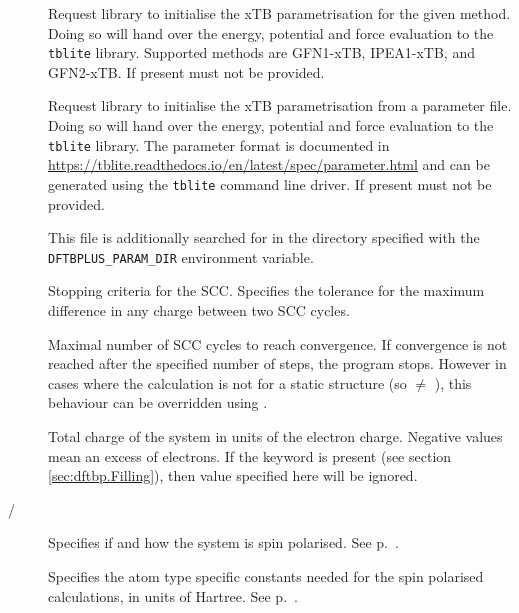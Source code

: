 \begin{description}
\item[]
  Request library to initialise the xTB parametrisation for the given method.
  Doing so will hand over the energy, potential and force evaluation to the
  \texttt{tblite} library.
  Supported methods are GFN1-xTB\cite{grimme2017}, IPEA1-xTB\cite{asgeirsson2017},
  and GFN2-xTB\cite{bannwarth2019}.
  If present  must not be provided.

\item[]
  Request library to initialise the xTB parametrisation from a parameter file.
  Doing so will hand over the energy, potential and force evaluation to the
  \texttt{tblite} library.
  The parameter format is documented in
  \url{https://tblite.readthedocs.io/en/latest/spec/parameter.html} and can
  be generated using the \texttt{tblite} command line driver.
  If present  must not be provided.

  This file is additionally searched for in the directory specified with the
  \texttt{DFTBPLUS\_PARAM\_DIR} environment variable.

\item[] Stopping criteria for the SCC.  Specifies the
  tolerance for the maximum difference in any charge between two SCC
  cycles.

\item[] Maximal number of SCC cycles to reach
  convergence. If convergence is not reached after the specified
  number of steps, the program stops. However in cases where the
  calculation is not for a static structure (so  $\neq$
  \cb), this behaviour can be overridden using
  .

\item[] Total charge of the system in units of the electron
  charge. Negative values mean an excess of electrons. If the keyword
   is present (see section \ref{sec:dftbp.Filling}), then value
  specified here will be ignored.

\item[ / ] Specifies if and how the
    system is spin polarised. See p.~.

\item[] Specifies the atom type specific constants needed for
  the spin polarised calculations, in units of Hartree.  See
  p.~.


\end{description}
